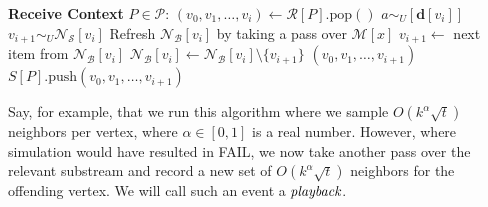 \documentclass[10]{report}
\newcommand{\push}[1]{\text{push} \left ( #1 \right )}
\newcommand{\pop}{\text{pop}()}
\begin{document}
\begin{algorithm}[htbp]
\begin{flushleft}
\end{flushleft}
\begin{flushleft}
\begin{algorithmic}[1]
	\Statex \textbf{Receive Context} $P \in \mathcal{P}$:
  			\State $(v_0, v_1, \dots, v_i) \gets \mathcal{R}[P].\pop$
			\State $a \sim_U [\mathbf{d}[{v_i}]] $
				\State $v_{i+1} \sim_U \mathcal{N}_\mathcal{S}[v_i]$
			\Else
					\State Refresh $\mathcal{N}_\mathcal{B}[v_i]$ by taking a pass over $\mathcal{M}[x]$
				\EndIf
				\State $v_{i+1} \gets$ next item from $\mathcal{N}_\mathcal{B}[v_i]$
				\State $\mathcal{N}_\mathcal{B}[v_i] \gets \mathcal{N}_\mathcal{B}[v_i] \setminus \{v_{i+1}\}$
			\EndIf
				\State \Return $(v_0, v_1, \dots, v_{i+1})$
			\Else
				\State $S[P].\push{v_0, v_1, \dots, v_{i+1}}$
			\EndIf
  		\EndWhile
\end{algorithmic}
\end{flushleft}
\end{algorithm}


Say, for example, that we run this algorithm where we sample $O(k^\alpha \sqrt{t})$ neighbors per vertex, where $\alpha \in [0,1]$ is a real number.
However, where simulation would have resulted in FAIL, we now take another pass over the relevant substream and record a new set of $O(k^\alpha \sqrt{t})$ neighbors for the offending vertex.
We will call such an event a $\emph{playback}$.
\end{document}

